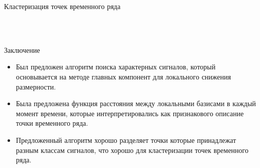 \documentclass{beamer}
\begin{document}
\begin{frame}{Кластеризация точек временного ряда}
	\begin{figure}[h!t]\center
		\\
		\\
	\end{figure}
\end{frame}
\begin{frame}{Заключение}
	\begin{itemize}
		\item Был предложен алгоритм поиска характерных сигналов, который основывается на методе главных компонент для локального снижения размерности.
		\item Была предложена функция расстояния между локальными базисами в каждый момент времени, которые интерпретировались как признакового описание точки временного ряда.
		\item Предложенный алгоритм хорошо разделяет точки которые принадлежат разным классам сигналов, что хорошо для кластеризации точек временного ряда.
	\end{itemize}
\end{frame}
\end{document}

